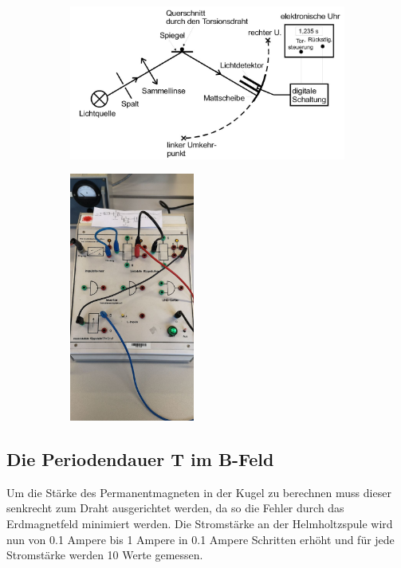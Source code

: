 \begin{figure}[h]
    \begin{subfigure}[c]{0.5\textwidth}
        \centering
        \includegraphics[width=1\textwidth, height=0.5\textwidth]{bilder/lichtuhr.jpeg}
        \label{fig:lichtuhr}
    \end{subfigure}
    \begin{subfigure}[c]{0.5\textwidth}
        \centering
        \includegraphics[width=0.45\textwidth, height=0.6\textwidth]{bilder/Schaltung.jpeg}
        \label{fig:Schaltung}
    \end{subfigure}
\end{figure}


\subsection{Die Periodendauer T im B-Feld}
Um die Stärke des Permanentmagneten in der Kugel zu berechnen muss dieser senkrecht zum Draht ausgerichtet werden, da so die Fehler durch das Erdmagnetfeld minimiert werden.
Die Stromstärke an der Helmholtzspule wird nun von 0.1 Ampere bis 1 Ampere in 0.1 Ampere Schritten erhöht und für jede Stromstärke werden 10 Werte gemessen.